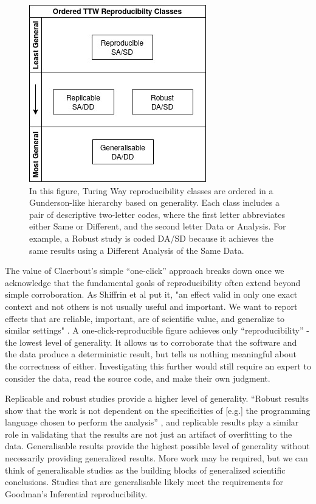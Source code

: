 \begin{figure}[htbp]
\centering
\includegraphics[width=.5\textwidth]{figures/repro_outcomes.jpg}
\caption[Hierarchically arranged reproducibility classes]%
{In this figure, Turing Way reproducibility classes are ordered in a
Gunderson-like hierarchy based on generality. Each class includes a pair of
descriptive two-letter codes, where the first letter abbreviates either Same or
Different, and the second letter Data or Analysis. For example, a Robust study
is coded DA/SD because it achieves the same results using a Different Analysis
of the Same Data.}
\label{fig:repro_classes}
\end{figure}

The value of Claerbout’s simple “one-click” approach breaks down once we
acknowledge that the fundamental goals of reproducibility often extend beyond
simple corroboration. As Shiffrin et al put it, "an effect valid in only one
exact context and not others is not usually useful and important. We want to
report effects that are reliable, important, are of scientific value, and
generalize to similar settings" \parencite[2633]{shiffrin_scientific_2018}.
A one-click-reproducible figure achieves only “reproducibility” - the lowest
level of generality. It allows us to corroborate that the software and the data
produce a deterministic result, but tells us nothing meaningful about the
correctness of either. Investigating this further would still require an expert
to consider the data, read the source code, and make their own judgment.

Replicable and robust studies provide a higher level of generality. “Robust
results show that the work is not dependent on the specificities of [e.g.] the
programming language chosen to perform the analysis”
\parencite{community_definitions_2021}, and replicable results
play a similar role in validating that the results are not just an artifact of
overfitting to the data. Generalisable results provide the highest possible
level of generality without necessarily providing generalized results. More work
may be required, but we can think of generalisable studies as the building
blocks of generalized scientific conclusions. Studies that are generalisable
likely meet the requirements for Goodman’s Inferential reproducibility.


